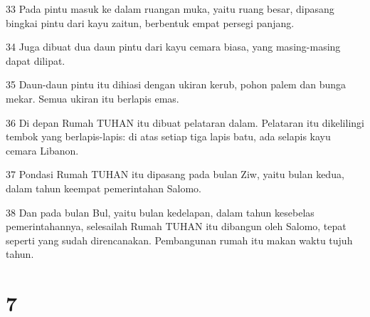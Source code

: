 \par 33 Pada pintu masuk ke dalam ruangan muka, yaitu ruang besar, dipasang bingkai pintu dari kayu zaitun, berbentuk empat persegi panjang.
\par 34 Juga dibuat dua daun pintu dari kayu cemara biasa, yang masing-masing dapat dilipat.
\par 35 Daun-daun pintu itu dihiasi dengan ukiran kerub, pohon palem dan bunga mekar. Semua ukiran itu berlapis emas.
\par 36 Di depan Rumah TUHAN itu dibuat pelataran dalam. Pelataran itu dikelilingi tembok yang berlapis-lapis: di atas setiap tiga lapis batu, ada selapis kayu cemara Libanon.
\par 37 Pondasi Rumah TUHAN itu dipasang pada bulan Ziw, yaitu bulan kedua, dalam tahun keempat pemerintahan Salomo.
\par 38 Dan pada bulan Bul, yaitu bulan kedelapan, dalam tahun kesebelas pemerintahannya, selesailah Rumah TUHAN itu dibangun oleh Salomo, tepat seperti yang sudah direncanakan. Pembangunan rumah itu makan waktu tujuh tahun.

\chapter{7}

